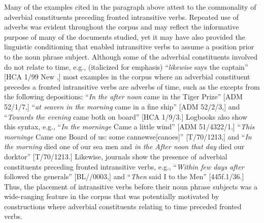   Many of the examples cited in the paragraph above attest to the commonality of adverbial constituents preceding fronted intransitive verbs. Repeated use of adverbs was evident throughout the corpus and may reflect the informative purpose of many of the documents studied, yet it may have also provided the linguistic conditioning that enabled intransitive verbs to assume a position prior to the noun phrase subject. Although some of the adverbial constituents involved do not relate to time, e.g., (italicized for emphasis) “\textit{likewise} says the captain” [HCA 1/99 New \citealt{Providence1722},] most examples in the corpus where an adverbial constituent precedes a fronted intransitive verbs are adverbs of time, such as the excepts from the following depositions: “\textit{In the after noon} came in the Tiger Prize” [ADM 52/1/7,] “\textit{at seaven in the morning} came in a fine ship” [ADM 52/2/3,] and “\textit{Towards the evening} came both on board” [HCA 1/9/3.] Logbooks also show this syntax, e.g., “\textit{In the morninge} Came a little wind” [ADM 51/4322/1,] “\textit{This morninge} Came one Board of us: some cannewse[canoes]” [T/70/1213,] and “\textit{In the morning} died one of our sea men and \textit{in the After noon that day} died our dorktor” [T/70/1213.] Likewise, journals show the presence of adverbial constituents preceding fronted intransitive verbs, e.g., “\textit{Within few days after} followed the generals” [BL/\citealt{Egerton2395}/0003,] and “\textit{Then} said I to the Men” [445f.1/36.] Thus, the placement of intransitive verbs before their noun phrase subjects was a wide-ranging feature in the corpus that was potentially motivated by constructions where adverbial constituents relating to time preceded fronted verbs.  

